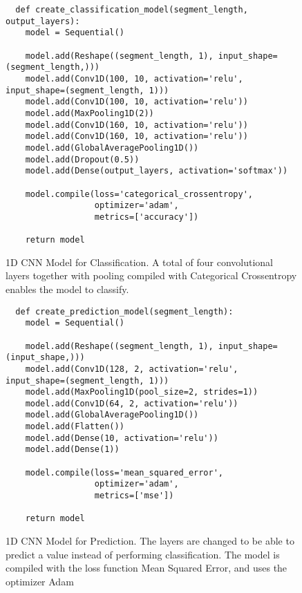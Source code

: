 \begin{figure}[h]
\begin{code}
  \begin{verbatim}
  def create_classification_model(segment_length, output_layers):
    model = Sequential()

    model.add(Reshape((segment_length, 1), input_shape=(segment_length,)))
    model.add(Conv1D(100, 10, activation='relu', input_shape=(segment_length, 1)))
    model.add(Conv1D(100, 10, activation='relu'))
    model.add(MaxPooling1D(2))
    model.add(Conv1D(160, 10, activation='relu'))
    model.add(Conv1D(160, 10, activation='relu'))
    model.add(GlobalAveragePooling1D())
    model.add(Dropout(0.5))
    model.add(Dense(output_layers, activation='softmax'))

    model.compile(loss='categorical_crossentropy', 
                  optimizer='adam', 
                  metrics=['accuracy'])

    return model
  \end{verbatim}
  \caption{1D CNN Model for Classification. A total of four convolutional layers together with pooling compiled with Categorical Crossentropy enables the model to classify.}
  \label{code:1d_conv_net_classifier}
\end{code}
\end{figure}

\begin{figure}[h]
\begin{code}
  \begin{verbatim}
  def create_prediction_model(segment_length):
    model = Sequential()

    model.add(Reshape((segment_length, 1), input_shape=(input_shape,)))
    model.add(Conv1D(128, 2, activation='relu', input_shape=(segment_length, 1)))
    model.add(MaxPooling1D(pool_size=2, strides=1))
    model.add(Conv1D(64, 2, activation='relu'))
    model.add(GlobalAveragePooling1D())
    model.add(Flatten())
    model.add(Dense(10, activation='relu'))
    model.add(Dense(1))
    
    model.compile(loss='mean_squared_error', 
                  optimizer='adam', 
                  metrics=['mse'])

    return model
  \end{verbatim}
  \caption{1D CNN Model for Prediction. The layers are changed to be able to predict a value instead of performing classification. The model is compiled with the loss function Mean Squared Error, and uses the optimizer Adam}
  \label{code:1d_conv_net_predictor}
\end{code}
\end{figure}